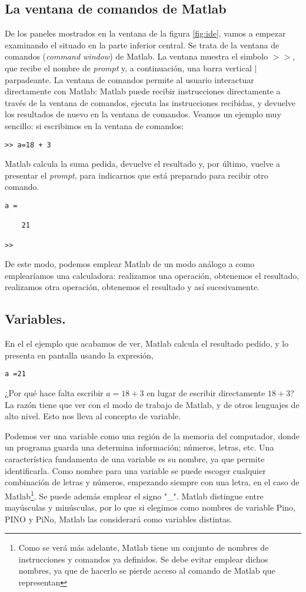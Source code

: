 \subsection{La ventana de comandos de Matlab} 
De los paneles mostrados en la ventana de la figura \ref{fig:ide}, vamos a empezar examinando el situado en la parte inferior central. Se trata de la ventana de comandos (\emph{command window}) de Matlab.   La ventana muestra el simbolo $>>$, que recibe el nombre de \emph{prompt} y, a continuación, una barra vertical $|$ parpadeante.  La ventana de comandos permite al usuario interactuar directamente con Matlab: Matlab puede recibir instrucciones directamente a través de la ventana de comandos, ejecuta las instrucciones recibidas, y devuelve los resultados de nuevo en la ventana de comandos. Veamos un ejemplo muy sencillo: si escribimos en la ventana de comandos:

\begin{verbatim}
>> a=18 + 3
\end{verbatim}

Matlab calcula la suma pedida, devuelve el resultado y, por último, vuelve a presentar el \emph{prompt}, para indicarnos que está preparado para recibir otro comando.

\begin{verbatim}
a =

    21

>> 
\end{verbatim}

De este modo, podemos emplear Matlab de un modo análogo a como emplearíamos una calculadora: realizamos una operación, obtenemos el resultado, realizamos otra operación, obtenemos el resultado  y así sucesivamente.
\subsection{Variables.} 
En el el ejemplo que acabamos de ver, Matlab calcula el resultado pedido, y lo presenta en pantalla usando la expresión, \begin{verbatim}
a =21
\end{verbatim} ¿Por qué hace falta escribir $a=18+3$ en lugar de escribir directamente $18+3$? La razón tiene que ver con el modo de trabajo de Matlab, y de otros lenguajes de alto nivel. Esto nos lleva al concepto de variable. 

Podemos ver una variable como una región de la memoria del computador, donde un programa guarda una determina información; números, letras, etc. Una característica fundamenta de una variable es su nombre, ya que permite identificarla.  Como nombre para una variable se puede escoger cualquier combinación de letras y números, empezando siempre con una letra, en el caso de Matlab\footnote{Como se verá más adelante, Matlab tiene un conjunto de nombres de instrucciones y comandos ya definidos. Se debe evitar emplear dichos nombres, ya que de hacerlo se pierde acceso al comando de Matlab que representan}. Se puede además emplear el signo "\_". Matlab distingue entre mayúsculas y minúsculas, por lo que si elegimos como nombres de variable Pino, PINO y PiNo, Matlab las considerará como variables distintas. 

